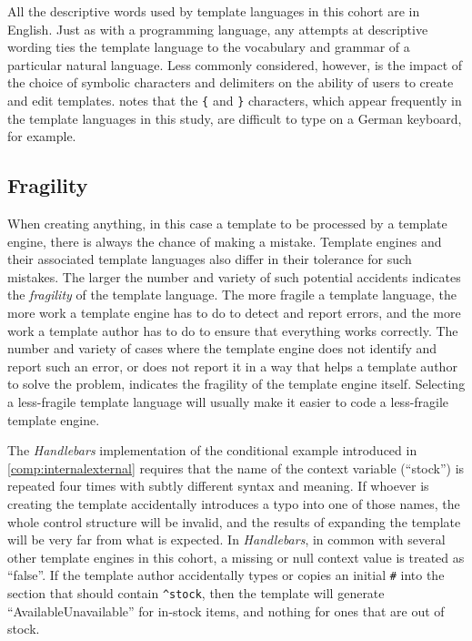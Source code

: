 All the descriptive words used by \gls{template language}s in this cohort are in English. Just as with a \gls{programming language}, any attempts at descriptive wording ties the \gls{template language} to the vocabulary and grammar of a particular natural language. Less commonly considered, however, is the impact of the choice of symbolic characters and delimiters on the ability of users to create and edit templates. \citet{Erz2023a} notes that the \verb!{! and \verb!}! characters, which appear frequently in the \gls{template language}s in this study, are difficult to type on a German keyboard, for example.

\subsection{Fragility}
\label{comp:fragility}

When creating anything, in this case a template to be processed by a \gls{template engine}, there is always the chance of making a mistake. Template engines and their associated \gls{template language}s also differ in their tolerance for such mistakes. The larger the number and variety of such potential accidents indicates the \emph{fragility} of the \gls{template language}. The more fragile a \gls{template language}, the more work a \gls{template engine} has to do to detect and report errors, and the more work a template author has to do to ensure that everything works correctly. The number and variety of cases where the \gls{template engine} does not identify and report such an error, or does not report it in a way that helps a template author to solve the problem, indicates the fragility of the \gls{template engine} itself. Selecting a less-fragile \gls{template language} will usually make it easier to code a less-fragile \gls{template engine}.

The \emph{Handlebars} implementation of the conditional example introduced in \autoref{comp:internalexternal} requires that the name of the context variable (\enquote{stock}) is repeated four times with subtly different syntax and meaning. If whoever is creating the template accidentally introduces a typo into one of those names, the whole control structure will be invalid, and the results of expanding the template will be very far from what is expected. In \emph{Handlebars}, in common with several other \gls{template engine}s in this cohort, a missing or null context value is treated as \enquote{false}. If the template author accidentally types or copies an initial \verb!#! into the section that should contain \verb!^stock!, then the template will generate \enquote{AvailableUnavailable} for in-stock items, and nothing for ones that are out of stock.

